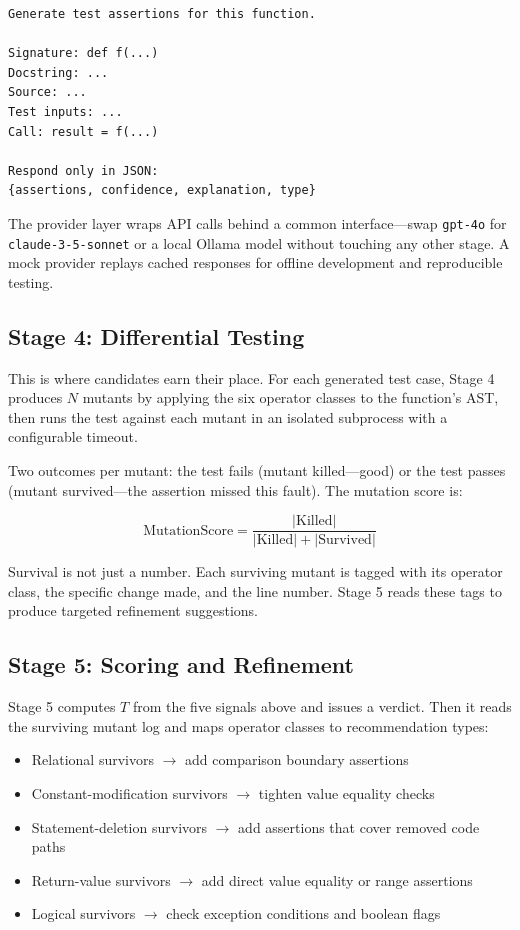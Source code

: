 \documentclass[conference]{IEEEtran}
\begin{document}
\begin{lstlisting}
Generate test assertions for this function.

Signature: def f(...)
Docstring: ...
Source: ...
Test inputs: ...
Call: result = f(...)

Respond only in JSON:
{assertions, confidence, explanation, type}
\end{lstlisting}

The provider layer wraps API calls behind a common interface—swap \texttt{gpt-4o} for \texttt{claude-3-5-sonnet} or a local Ollama model without touching any other stage. A mock provider replays cached responses for offline development and reproducible testing.

\subsection{Stage 4: Differential Testing}

This is where candidates earn their place. For each generated test case, Stage 4 produces $N$ mutants by applying the six operator classes to the function's AST, then runs the test against each mutant in an isolated subprocess with a configurable timeout.

Two outcomes per mutant: the test fails (mutant killed—good) or the test passes (mutant survived—the assertion missed this fault). The mutation score is:

\[
\text{MutationScore} = \frac{|\text{Killed}|}{|\text{Killed}| + |\text{Survived}|}
\]

Survival is not just a number. Each surviving mutant is tagged with its operator class, the specific change made, and the line number. Stage 5 reads these tags to produce targeted refinement suggestions.

\subsection{Stage 5: Scoring and Refinement}

Stage 5 computes $T$ from the five signals above and issues a verdict. Then it reads the surviving mutant log and maps operator classes to recommendation types:

\begin{itemize}
\item Relational survivors $\rightarrow$ add comparison boundary assertions
\item Constant-modification survivors $\rightarrow$ tighten value equality checks
\item Statement-deletion survivors $\rightarrow$ add assertions that cover removed code paths
\item Return-value survivors $\rightarrow$ add direct value equality or range assertions
\item Logical survivors $\rightarrow$ check exception conditions and boolean flags
\end{itemize}
\end{document}
